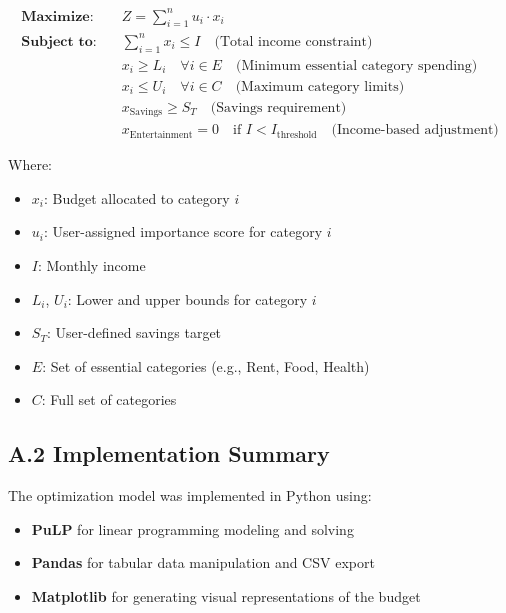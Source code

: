 \documentclass{article}
\begin{document}
\begin{align*}
    \textbf{Maximize:} \quad   & Z = \sum_{i=1}^{n} u_i \cdot x_i                                                                              \\
    \textbf{Subject to:} \quad & \sum_{i=1}^{n} x_i \leq I \quad \text{(Total income constraint)}                                              \\
                               & x_i \geq L_i \quad \forall i \in E \quad \text{(Minimum essential category spending)}                         \\
                               & x_i \leq U_i \quad \forall i \in C \quad \text{(Maximum category limits)}                                     \\
                               & x_{\text{Savings}} \geq S_T \quad \text{(Savings requirement)}                                                \\
                               & x_{\text{Entertainment}} = 0 \quad \text{if } I < I_{\text{threshold}} \quad \text{(Income-based adjustment)}
\end{align*}

Where:
\begin{itemize}
    \item $x_i$: Budget allocated to category $i$
    \item $u_i$: User-assigned importance score for category $i$
    \item $I$: Monthly income
    \item $L_i$, $U_i$: Lower and upper bounds for category $i$
    \item $S_T$: User-defined savings target
    \item $E$: Set of essential categories (e.g., Rent, Food, Health)
    \item $C$: Full set of categories
\end{itemize}

\subsection*{A.2 Implementation Summary}

The optimization model was implemented in Python using:
\begin{itemize}
    \item \textbf{PuLP} for linear programming modeling and solving
    \item \textbf{Pandas} for tabular data manipulation and CSV export
    \item \textbf{Matplotlib} for generating visual representations of the budget
\end{itemize}
\end{document}
